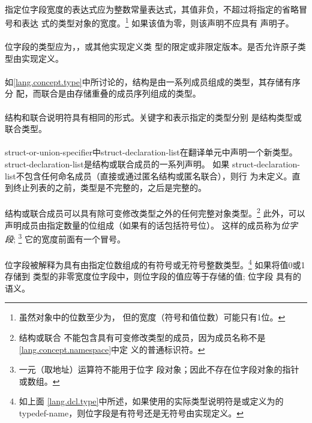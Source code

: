 \paragraph{}
指定位字段宽度的表达式应为整数常量表达式，其值非负，不超过将指定的省略冒号和表达
式的类型对象的宽度。\footnote{虽然对象中的位数至少为，
但的宽度（符号和值位数）可能只有1位。} 如果该值为零，则该声明不应具有
声明子。

\paragraph{}
位字段的类型应为，，或其他实现定义类
型的限定或非限定版本。是否允许原子类型由实现定义。

\semantic
\paragraph{}
如\ref{lang.concept.type}中所讨论的，结构是由一系列成员组成的类型，其存储有序分
配，而联合是由存储重叠的成员序列组成的类型。

\paragraph{}
结构和联合说明符具有相同的形式。关键字和表示指定的类型分别
是结构类型或联合类型。

\paragraph{}
struct-or-union-specifier中struct-declaration-list在翻译单元中声明一个新类型。
struct-declaration-list是结构或联合成员的一系列声明。 如果
struct-declaration-list不包含任何命名成员（直接或通过匿名结构或匿名联合），则行
为未定义。直到终止列表的\tm{\}}之前，类型是不完整的，之后是完整的。

\paragraph{}
结构或联合成员可以具有除可变修改类型之外的任何完整对象类型。\footnote{结构或联合
不能包含具有可变修改类型的成员，因为成员名称不是\ref{lang.concept.namespace}中定
义的普通标识符。} 此外，可以声明成员由指定数量的位组成（如果有的话包括符号位）。
这样的成员称为\textit{位字段}; \footnote{一元\tm{\&}（取地址）运算符不能用于位字
段对象；因此不存在位字段对象的指针或数组。} 它的宽度前面有一个冒号。

\paragraph{}
位字段被解释为具有由指定位数组成的有符号或无符号整数类型。\footnote{如上面
\ref{lang.dcl.type}中所述，如果使用的实际类型说明符是或定义为的
typedef-name，则位字段是有符号还是无符号由实现定义。} 如果将值0或1存储到
类型的非零宽度位字段中，则位字段的值应等于存储的值; 位字段
具有的语义。

